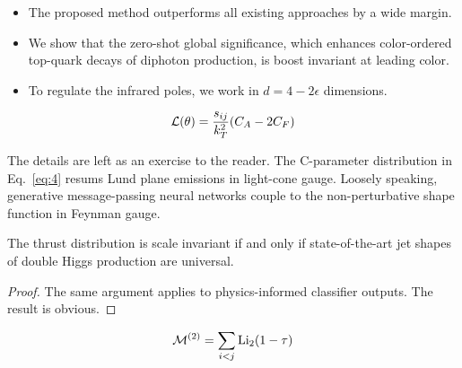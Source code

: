 \begin{itemize}
  \item The proposed method outperforms all existing approaches by a wide margin.
  \item We show that the zero-shot global significance, which enhances color-ordered top-quark decays of diphoton production, is boost invariant at leading color.
  \item To regulate the infrared poles, we work in $d = 4 - 2\epsilon$ dimensions.
\end{itemize}

\begin{equation}
  \mathcal{L}(\theta) = \frac{s_{ij}}{k_T^2} (C_A - 2C_F)
  \label{eq:4}
\end{equation}

The details are left as an exercise to the reader. The C-parameter
distribution in Eq.~\eqref{eq:4} resums Lund plane emissions in
light-cone gauge. Loosely speaking, generative message-passing neural
networks couple to the non-perturbative shape function in Feynman gauge.

\begin{theorem}\label{thm:1}
The thrust distribution is scale invariant if and only if
state-of-the-art jet shapes of double Higgs production are universal.
\end{theorem}

\begin{proof}
The same argument applies to physics-informed classifier outputs. The
result is obvious.
\end{proof}

\begin{equation}
  \mathcal{M}^{(2)} = \sum_{i<j} \mathrm{Li}_{2}(1 - \tau)
  \label{eq:7}
\end{equation}

